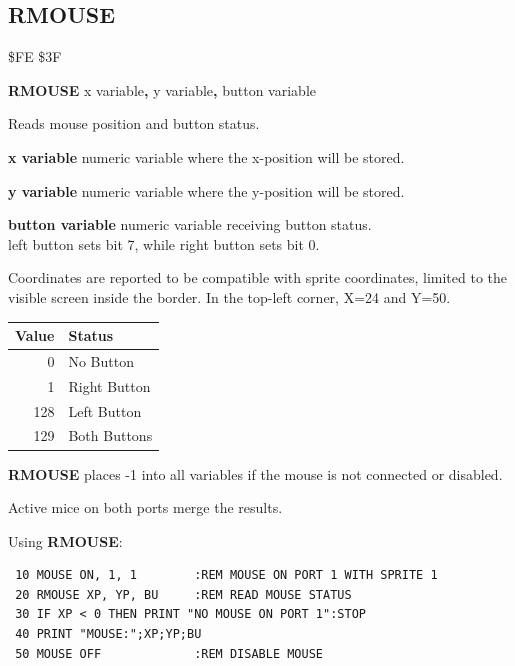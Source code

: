 \subsection{RMOUSE}
\begin{description}[leftmargin=2cm,style=nextline]
\item [Token:] \$FE \$3F
\item [Format:] {\bf RMOUSE} x variable{\bf,} y variable{\bf,} button variable
\item [Usage:] Reads mouse position and button status.

               {\bf x variable} numeric variable where the x-position will be stored.

               {\bf y variable} numeric variable where the y-position will be stored.

               {\bf button variable} numeric variable receiving button status. \\
               left button sets bit 7, while right button sets bit 0.

               Coordinates are reported to be compatible with sprite
               coordinates, limited to the visible screen inside the border.
               In the top-left corner, X=24 and Y=50.

\begin{center}
{\setlength{\tabcolsep}{1mm}
\begin{tabular}{|r|l|}
\hline
{\bf Value}  & {\bf Status} \\
\hline
0   & No Button \\
1   & Right Button \\
128 & Left Button \\
129 & Both Buttons \\
\hline
\end{tabular}
}
\end{center}

{\bf RMOUSE} places -1 into all variables
if the mouse is not connected or disabled.

\item [Remarks:] Active mice on both ports merge the results.
\item [Example:] Using {\bf RMOUSE}:
\begin{tcolorbox}[colback=black,coltext=white]
\verbatimfont{\codefont}
\begin{verbatim}
 10 MOUSE ON, 1, 1        :REM MOUSE ON PORT 1 WITH SPRITE 1
 20 RMOUSE XP, YP, BU     :REM READ MOUSE STATUS
 30 IF XP < 0 THEN PRINT "NO MOUSE ON PORT 1":STOP
 40 PRINT "MOUSE:";XP;YP;BU
 50 MOUSE OFF             :REM DISABLE MOUSE
\end{verbatim}
\end{tcolorbox}
\end{description}

